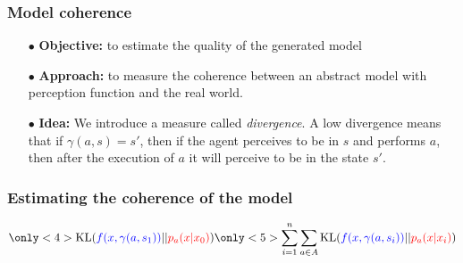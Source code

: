\documentclass{beamer}
\begin{document}
\begin{frame}
  \frametitle{Model coherence}
\begin{itemize}
\item[$\bullet$] 
{\bf Objective:} to estimate the quality of the generated model
\item[$\bullet$] 
{\bf Approach:} to measure the coherence between
an abstract model with perception function and the real world.
\item[$\bullet$]
{\bf Idea:} We introduce a measure called \emph{{\color {red} divergence}}.
A low divergence means that if
$\gamma(a,s) = s'$, then if the agent perceives to be in $s$ and
performs $a$, then after the execution of $a$ it will perceive to
be in the state $s'$.
\end{itemize}
\end{frame}

\begin{frame}
  \frametitle{Estimating the coherence of the model}
\begin{center}

$$
\only<4>{\text{KL}({\color{blue}f(x,\gamma(a,s_1))}||{\color{red}p_a(x|x_0)})}
\only<5>{\sum_{i=1}^n\sum_{a\in A}
  \text{KL}({\color{blue}f(x,\gamma(a,s_i))}||{\color{red}p_a(x|x_i)})}
$$
\end{center}
\end{frame}
\end{document}

